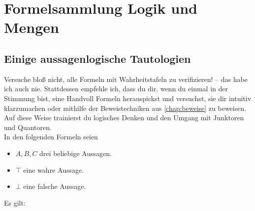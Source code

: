 




\chapter{Formelsammlung Logik und Mengen} \label{anhang:formelsammlung}


\section{Einige aussagenlogische Tautologien}
Versuche bloß nicht, alle Formeln mit Wahrheitstafeln zu verifizieren! -- das habe ich auch nie. Stattdessen empfehle ich, dass du dir, wenn du einmal in der Stimmung bist, eine Handvoll Formeln herauspickst und versuchst, sie dir intuitiv klarzumachen oder mithilfe der Beweistechniken aus \cref{chap:beweise} zu beweisen. Auf diese Weise trainierst du logisches Denken und den Umgang mit Junktoren und Quantoren. \\[0.5em]
In den folgenden Formeln seien
\begin{itemize}
    \item $A,B,C$ drei beliebige Aussagen.
    \item $\top$ eine wahre Aussage.
    \item $\bot$ eine falsche Aussage.
\end{itemize}
Es gilt:
\begingroup
\allowdisplaybreaks
